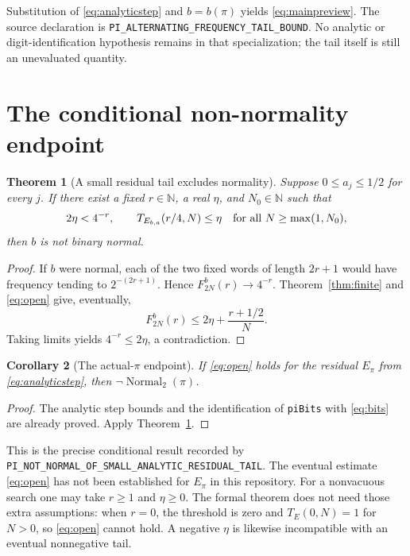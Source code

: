 \documentclass[11pt,a4paper]{article}
\newtheorem{theorem}{Theorem}[section]
\newtheorem{corollary}[theorem]{Corollary}
\theoremstyle{definition}
\theoremstyle{remark}
\newcommand{\N}{\mathbb N}
\newcommand{\Normal}{\operatorname{Normal}_2}
\newcommand{\code}[1]{{\small\nolinkurl{#1}}}
\begin{document}
Substitution of \eqref{eq:analyticstep} and $b=b(\pi)$ yields
\eqref{eq:mainpreview}. The source declaration is
\code{PI_ALTERNATING_FREQUENCY_TAIL_BOUND}.
No analytic or digit-identification hypothesis remains in that
specialization; the tail itself is still an unevaluated quantity.

\section{The conditional non-normality endpoint}
\label{sec:closure}

\begin{theorem}[A small residual tail excludes normality]
\label{thm:closure}
Suppose $0\le a_j\le1/2$ for every $j$. If there exist a fixed
$r\in\N$, a real $\eta$, and $N_0\in\N$ such that
\begin{equation}
 2\eta<4^{-r},\qquad
 T_{E_{b,a}}(r/4,N)\le\eta
 \quad\hbox{for all }N\ge\max(1,N_0),
 \label{eq:open}
\end{equation}
then $b$ is not binary normal.
\end{theorem}
\begin{proof}
If $b$ were normal, each of the two fixed words of length $2r+1$
would have frequency tending to $2^{-(2r+1)}$. Hence
$F_{2N}^b(r)\to4^{-r}$.
Theorem~\ref{thm:finite} and \eqref{eq:open} give, eventually,
\[
 F_{2N}^b(r)\le2\eta+\frac{r+1/2}{N}.
\]
Taking limits yields $4^{-r}\le2\eta$, a contradiction.
\end{proof}

\begin{corollary}[The actual-$\pi$ endpoint]
\label{cor:pi}
If \eqref{eq:open} holds for the residual $E_\pi$ from
\eqref{eq:analyticstep}, then $\neg\Normal(\pi)$.
\end{corollary}
\begin{proof}
The analytic step bounds and the identification of \code{piBits}
with \eqref{eq:bits} are already proved. Apply
Theorem~\ref{thm:closure}.
\end{proof}

This is the precise conditional result recorded by
\code{PI_NOT_NORMAL_OF_SMALL_ANALYTIC_RESIDUAL_TAIL}.
The eventual estimate \eqref{eq:open} has not been established for
$E_\pi$ in this repository.
For a nonvacuous search one may take $r\ge1$ and $\eta\ge0$.
The formal theorem does not need those extra assumptions:
when $r=0$, the threshold is zero and $T_E(0,N)=1$ for $N>0$,
so \eqref{eq:open} cannot hold. A negative $\eta$ is likewise
incompatible with an eventual nonnegative tail.
\end{document}
